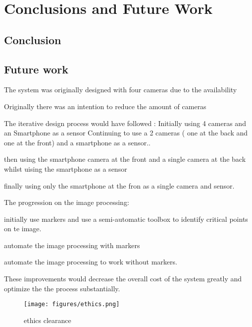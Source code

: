 \chapter{Conclusions and Future Work}

\section{Conclusion}

\section{Future work}
The system was originally designed with four cameras due to the availability

Originally there was an intention to reduce the amount of cameras

The iterative design process would have followed :
Initially using 4 cameras and an Smartphone as a sensor
Continuing to use a 2 cameras ( one at the back and one at the front)  and a smartphone as a sensor..

then using the smartphone camera at the front and a single camera at the back whilst uising the smartphone as a sensor

finally using only the smartphone at the fron as a single camera and sensor.


The progression on the image processing:

initially use markers and use a semi-automatic toolbox to identify critical points on te image.

automate the image processing with markers

automate the image processing to work without markers.


These improvements would decrease the overall cost of the system greatly and optimize the the process substantially. 

\newpage
\begin{figure}[!ht] 
\captionsetup{width=1\linewidth, font=small}  
\texttt{[image: figures/ethics.png]}
\caption{ethics clearance}
\label{fig:ethics}
\end{figure}








